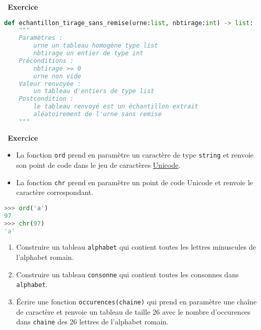 \documentclass[
  10pt,
]{article}
\newcommand{\passthrough}[1]{#1}
\providecommand{\tightlist}{%
  \setlength{\itemsep}{0pt}\setlength{\parskip}{0pt}}
\newcounter{exo}
\newenvironment{exercice}[1]
{\par \medskip   \addtocounter{exo}{1} \noindent  
\begin{bclogo}[arrondi =0.1,   noborder = true, logo=\bccrayon, marge=4]{~\textbf{Exercice} \textbf{\theexo} {\itshape #1} }  \par}
{
\end{bclogo}
 \par \bigskip }
\newcounter{def}
\begin{document}
\begin{exercice}{}
\begin{enumerate}
\begin{lstlisting}[language=Python]
def echantillon_tirage_sans_remise(urne:list, nbtirage:int) -> list:
    """ 
    Paramètres :
        urne un tableau homogène type list
        nbtirage un entier de type int
    Préconditions :
        nbtirage >= 0
        urne non vide
    Valeur renvoyée :
        un tableau d'entiers de type list
    Postcondition :
        le tableau renvoyé est un échantillon extrait
        aléatoirement de l'urne sans remise
    """
\end{lstlisting}
\end{enumerate}

\end{exercice}

\begin{exercice}{}

\begin{itemize}
\tightlist
\item
  La fonction \passthrough{\lstinline!ord!} prend en paramètre un
  caractère de type \passthrough{\lstinline!string!} et renvoie son
  point de code dans le jeu de caractères
  \href{https://fr.wikipedia.org/wiki/Unicode}{Unicode}.
\item
  La fonction \passthrough{\lstinline!chr!} prend en paramètre un point
  de code Unicode et renvoie le caractère correspondant.
\end{itemize}

\begin{lstlisting}[language=Python]
>>> ord('a')
97
>>> chr(97)
'a'
\end{lstlisting}

\begin{enumerate}
\def\labelenumi{\arabic{enumi}.}
\tightlist
\item
  Construire un tableau \passthrough{\lstinline!alphabet!} qui contient
  toutes les lettres minuscules de l'alphabet romain.
\item
  Construire un tableau \passthrough{\lstinline!consonne!} qui contient
  toutes les consonnes dans \passthrough{\lstinline!alphabet!}.
\item
  Écrire une fonction \passthrough{\lstinline!occurences(chaine)!} qui
  prend en paramètre une chaîne de caractère et renvoie un tableau de
  taille 26 avec le nombre d'occurences dans
  \passthrough{\lstinline!chaine!} des 26 lettres de l'alphabet romain.
\end{enumerate}

\end{exercice}
\end{document}
